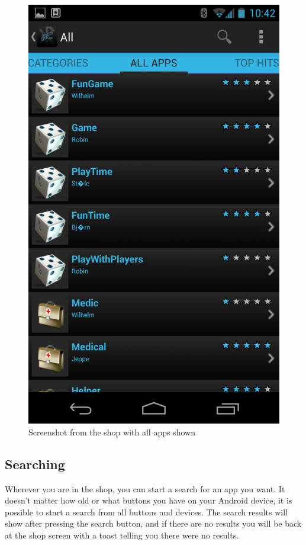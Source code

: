 \newline
\begin{figure}[H]
	\centering
	\includegraphics[scale = 0.3]{images/Screenshots/all_apps.png}
	\caption{Screenshot from the shop with all apps shown}
\end{figure}

\subsection{Searching}
Wherever you are in the shop, you can start a search for an app you want. It doesn't matter how old or what buttons you have on your Android device, it is possible to start a search from all buttons and devices. The search results will show after pressing the search button, and if there are no results you will be back at the shop screen with a toast telling you there were no results.

